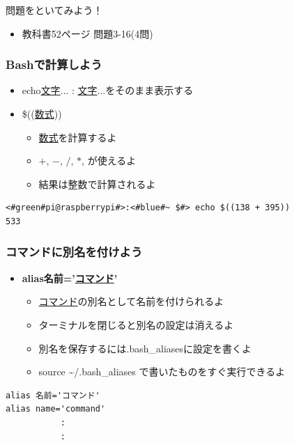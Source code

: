 \documentclass[slide03.tex]{subfiles}
\begin{document}
\begin{frame}
    \begin{exampleblock}{問題をといてみよう！}
        \begin{itemize}
            \item 教科書52ページ 問題3-16(4問)
        \end{itemize}
    \end{exampleblock}
\end{frame}

\begin{frame}[fragile]
    \frametitle{Bashで計算しよう}
    \begin{itemize}
        \item echo\textvisiblespace\underline{文字}$\ldots$ : \underline{文字}$\ldots$をそのまま表示する
        \item \$((\underline{数式}))
        \begin{itemize}
            \small
            \item \underline{数式}を計算するよ
            \item $+$, $-$, $/$, $*$, が使えるよ
            \item 結果は整数で計算されるよ
        \end{itemize}
    \end{itemize}
    \begin{lstlisting}[title=echo コマンドでの計算, label=cmdsbs:calc]
<#green#pi@raspberrypi#>:<#blue#~ $#> echo $((138 + 395))
533
    \end{lstlisting}
\end{frame}

\begin{frame}[fragile]
    \frametitle{コマンドに別名を付けよう}
    \begin{itemize}
        \item {\bf alias\textvisiblespace 名前='\underline{コマンド}'}
        \begin{itemize}
            \small
            \item \underline{コマンド}の別名として名前を付けられるよ
            \item ターミナルを閉じると別名の設定は消えるよ
            \item 別名を保存するには.bash\_aliasesに設定を書くよ
            \item source \sim/.bash\_aliases で書いたものをすぐ実行できるよ
        \end{itemize}
    \end{itemize}
    \begin{lstlisting}[title=\textasciitilde/.bash\_aliasesの書き方, label=bashAliasesGrammar1]
alias 名前='コマンド'
alias name='command'
           :
           :
    \end{lstlisting}
\end{frame}
\end{document}
